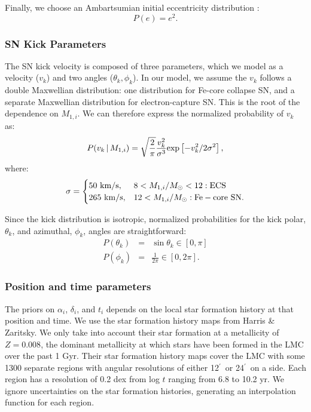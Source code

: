 \documentclass[12pt, preprint]{aastex}
\newcommand{\given}{\,|\,}
\newcommand{\amin}{\ifmmode {^{\prime}\ }\else$^{\prime}$\fi}
\newcommand{\Msun}{\ifmmode {M_{\odot}}\else${M_{\odot}}$\fi}
\begin{document}
Finally, we choose an Ambartsumian initial eccentricity distribution \citep{ambartsumian37, duquennoy91}:
\begin{equation}
P(e) = e^2.
\end{equation}


\subsubsection{SN Kick Parameters}

The SN kick velocity is composed of three parameters, which we model as a velocity ($v_k$) and two angles ($\theta_k, \phi_k$). In our model, we assume the $v_k$ follows a double Maxwellian distribution: one distribution for Fe-core collapse SN, and a separate Maxwellian distribution for electron-capture SN. This is the root of the dependence on $M_{1,i}$. We can therefore express the normalized probability of $v_k$ as:
\begin{equation}
P(v_k \given M_{1,i}) = \sqrt{\frac{2}{\pi}} \frac{v_k^2} {\sigma^3} {\rm exp} \left[ -v_k^2 / 2 \sigma^2 \right], \label{eq:P_v_k}
\end{equation}
where:
\begin{equation}
\sigma = 
\begin{cases} 
      50\ {\rm km/s}, & 8 < M_{1,i}/\Msun < 12: {\rm ECS}\\
     265\ {\rm km/s}, & 12 < M_{1,i}/\Msun: {\rm Fe-core\ SN}.
   \end{cases}
\end{equation}

Since the kick distribution is isotropic, normalized probabilities for the kick polar, $\theta_k$, and azimuthal, $\phi_k$, angles are straightforward:
\begin{eqnarray}
P(\theta_k) &=& \sin \theta_k \in [0, \pi] \label{eq:P_theta_k} \\
P(\phi_k) &=& \frac{1}{2 \pi} \in [0, 2\pi] . \label{eq:P_phi_k}
\end{eqnarray}


\subsubsection{Position and time parameters}


The priors on $\alpha_i$, $\delta_i$, and $t_i$ depends on the local star formation history at that position and time. We use the star formation history maps from Harris \& Zaritsky. We only take into account their star formation at a metallicity of $Z=0.008$, the dominant metallicity at which stars have been formed in the LMC over the past 1 Gyr. Their star formation history maps cover the LMC with some 1300 separate regions with angular resolutions of either 12\amin\ or 24\amin\ on a side. Each region has a resolution of 0.2 dex from log $t$ ranging from 6.8 to 10.2 yr. We ignore uncertainties on the star formation histories, generating an interpolation function for each region. 
\end{document}
